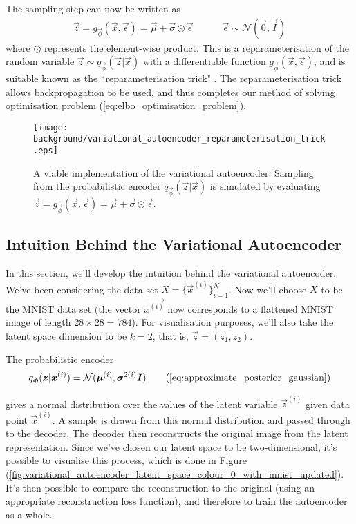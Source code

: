 The sampling step can now be written as
\begin{align}
\vec{z} = g_{\vec{\phi}}(\vec{x}, \vec{\epsilon}) = \vec{\mu} + \vec{\sigma} \odot \vec{\epsilon} \quad\quad\quad \vec{\epsilon} \sim \mathcal{N}(\vec{0}, \vec{I})
\label{eq:reparameterisation_trick}
\end{align}
where $\odot$ represents the element-wise product. This is a reparameterisation of the random variable $\vec{z}\sim q_{\vec{\phi}}(\vec{z}|\vec{x})$ with a differentiable function $g_{\vec{\phi}}(\vec{x}, \vec{\epsilon})$, and is suitable known as the ``reparameterisation trick" \cite{Kingma2014}. The reparameterisation trick allows backpropagation to be used, and thus completes our method of solving optimisation problem (\ref{eq:elbo_optimisation_problem}).\\

\begin{figure}[h!]
\centering
\captionsetup{justification=centering}
\texttt{[image: background/variational\_autoencoder\_reparameterisation\_trick.eps]}
\caption{A viable implementation of the variational autoencoder. Sampling from the probabilistic encoder $q_{\vec{\phi}}(\vec{z} | \vec{x})$ is simulated by evaluating $\vec{z} = g_{\vec{\phi}}(\vec{x}, \vec{\epsilon}) = \vec{\mu} + \vec{\sigma} \odot \vec{\epsilon}$.}
\label{fig:variational_autoencoder_reparameterisation_trick}
\end{figure}

\newpage
\subsection{Intuition Behind the Variational Autoencoder}
In this section, we'll develop the intuition behind the variational autoencoder. We've been considering the data set $X = \{ \vec{x}^{(i)} \}_{i=1}^{N}$. Now we'll choose $X$ to be the MNIST data set (the vector $\vec{x^{(i)}}$ now corresponds to a flattened MNIST image of length $28\times 28 = 784$). For visualisation purposes, we'll also take the latent space dimension to be $k = 2$, that is, $\vec{z} = (z_1, z_2)$.

The probabilistic encoder
\begin{align}
q_{\vec{\phi}}(\vec{z} | \vec{x}^{(i)}) = \mathcal{N}(\vec{\mu}^{(i)}, \vec{\sigma}^{2(i)}\vec{I})
\tag{\ref{eq:approximate_posterior_gaussian}}
\end{align}

gives a normal distribution over the values of the latent variable $\vec{z}^{(i)}$ given data point $\vec{x}^{(i)}$. A sample is drawn from this normal distribution and passed through to the decoder. The decoder then reconstructs the original image from the latent representation. Since we've chosen our latent space to be two-dimensional, it's possible to visualise this process, which is done in Figure (\ref{fig:variational_autoencoder_latent_space_colour_0_with_mnist_updated}). It's then possible to compare the reconstruction to the original (using an appropriate reconstruction loss function), and therefore to train the autoencoder as a whole.

